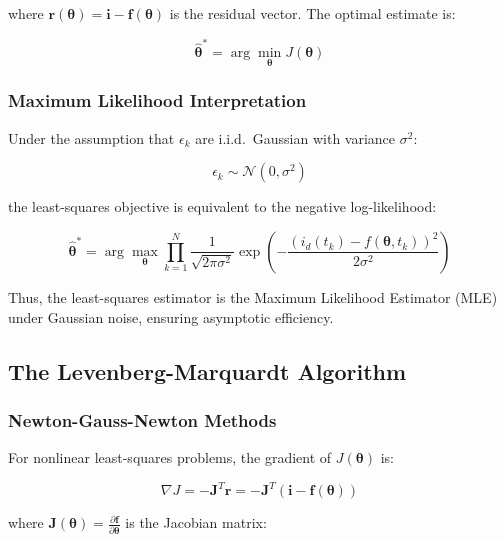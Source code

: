 \documentclass[12pt,a4paper]{article}
\newcommand{\hattheta}{\hat{\boldsymbol{\theta}}}
\begin{document}
where $\mathbf{r}(\boldsymbol{\theta}) = \mathbf{i} - \mathbf{f}(\boldsymbol{\theta})$ is the 
residual vector. The optimal estimate is:

\begin{equation}
\hattheta^* = \arg\min_{\boldsymbol{\theta}} J(\boldsymbol{\theta})
\label{eq:optimal_theta}
\end{equation}

\subsubsection{Maximum Likelihood Interpretation}

Under the assumption that $\epsilon_k$ are i.i.d.\ Gaussian with variance $\sigma^2$:

\begin{equation}
\epsilon_k \sim \mathcal{N}(0, \sigma^2)
\label{eq:noise_model}
\end{equation}

the least-squares objective is equivalent to the negative log-likelihood:

\begin{equation}
\hattheta^* = \arg\max_{\boldsymbol{\theta}} \prod_{k=1}^{N} \frac{1}{\sqrt{2\pi\sigma^2}} \exp\left( -\frac{(i_d(t_k) - f(\boldsymbol{\theta}, t_k))^2}{2\sigma^2} \right)
\label{eq:mle}
\end{equation}

Thus, the least-squares estimator is the Maximum Likelihood Estimator (MLE) under 
Gaussian noise, ensuring asymptotic efficiency.

\subsection{The Levenberg-Marquardt Algorithm}
\label{subsec:lm_algorithm}

\subsubsection{Newton-Gauss-Newton Methods}

For nonlinear least-squares problems, the gradient of $J(\boldsymbol{\theta})$ is:

\begin{equation}
\nabla J = -\mathbf{J}^T \mathbf{r} = -\mathbf{J}^T (\mathbf{i} - \mathbf{f}(\boldsymbol{\theta}))
\label{eq:gradient}
\end{equation}

where $\mathbf{J}(\boldsymbol{\theta}) = \frac{\partial \mathbf{f}}{\partial \boldsymbol{\theta}}$ is the Jacobian matrix:
\end{document}
